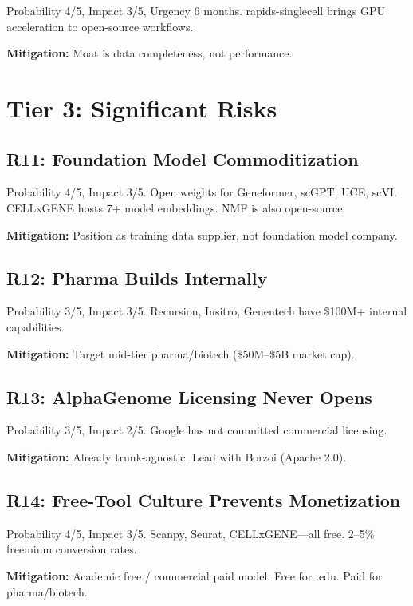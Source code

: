 \documentclass[10pt,twocolumn,letterpaper]{article}
\begin{document}
Probability 4/5, Impact 3/5, Urgency 6 months. rapids-singlecell brings
GPU acceleration to open-source workflows.

\textbf{Mitigation:} Moat is data completeness, not performance.

\section{Tier 3: Significant Risks}
\label{sec:significant}

\subsection{R11: Foundation Model Commoditization}

Probability 4/5, Impact 3/5. Open weights for Geneformer, scGPT, UCE, scVI.
CELLxGENE hosts 7+ model embeddings. NMF is also open-source.

\textbf{Mitigation:} Position as training data supplier, not foundation model
company.

\subsection{R12: Pharma Builds Internally}

Probability 3/5, Impact 3/5. Recursion, Insitro, Genentech have \$100M+
internal capabilities.

\textbf{Mitigation:} Target mid-tier pharma/biotech (\$50M--\$5B market cap).

\subsection{R13: AlphaGenome Licensing Never Opens}

Probability 3/5, Impact 2/5. Google has not committed commercial licensing.

\textbf{Mitigation:} Already trunk-agnostic. Lead with Borzoi (Apache 2.0).

\subsection{R14: Free-Tool Culture Prevents Monetization}

Probability 4/5, Impact 3/5. Scanpy, Seurat, CELLxGENE---all free. 2--5\%
freemium conversion rates.

\textbf{Mitigation:} Academic free / commercial paid model. Free for .edu.
Paid for pharma/biotech.
\end{document}
